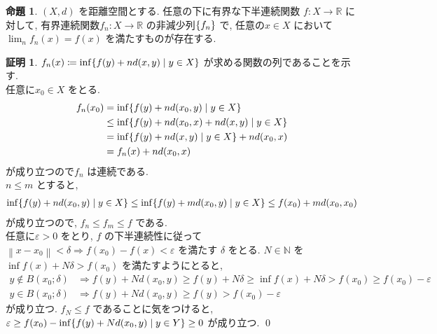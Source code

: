 \documentclass[10pt, fleqn, label-section=none, titlepage]{bxjsarticle}
\theoremstyle{definition}
\newtheorem{prop}[dfn]{命題}
\newtheorem*{pf*}{証明}
\newcommand{\veps}{\varepsilon}
\newcommand{\cbra}[1]{\mleft\{#1\mright\}}
\newcommand{\norm}[1]{\left\|#1\right\|}
\newcommand{\naraba}{\Rightarrow}
\renewcommand{\;}{\, ; \,}
\begin{document}
\begin{prop}
\label{1409}
$(X,d)$ を距離空間とする.  任意の下に有界な下半連続関数 $f:X\rightarrow \mathbb{R}$ に対して, 有界連続関数$f_n : X\rightarrow \mathbb{R}$ の非減少列$\cbra{f_n}$ で, 任意の$x  \in X$ において$\lim_n f_n (x) = f(x) $ を満たすものが存在する.
\end{prop}
\begin{pf*}
$f_n(x) \coloneqq \inf \cbra{f(y) + n d(x,y) \mid y \in X}$ が求める関数の列であることを示す. \\
任意に$x_0 \in X$ をとる.
\begin{align*}
f_n(x_0) &= \inf \cbra{f(y) + n d(x_0 , y) \mid y \in X } \\
&\leq \inf \cbra{f(y) + n d(x_0, x) + n d(x, y) \mid y \in X} \\
&= \inf \cbra{f(y) + nd(x,y) \mid y \in X} + n d(x_0, x) \\
&= f_n (x) + n d(x_0, x) 
\end{align*}
が成り立つので$f_n$ は連続である. \\
$n \leq m$ とすると, 
\begin{align*}
\inf \cbra{f(y) + n d(x_0, y) \mid y \in X} 
\leq \inf \cbra{f(y) + m d(x_0, y) \mid y \in X} \leq f(x_0) + md(x_0, x_0) 
\end{align*}
 が成り立つので, $f_n \leq f_m \leq f $ である. \\
 任意に$\veps > 0$ をとり, $f$ の下半連続性に従って$\norm{x - x_0} < \delta \naraba f(x_0) - f(x) < \veps$ を満たす $\delta$ をとる. $N \in \mathbb{N}$ を $\inf f(x) + N \delta > f(x_0) $ を満たすようにとると, 
\begin{align*}
 y \notin B(x_0; \delta) &\naraba f(y) + Nd(x_0,y) \geq f(y) + N\delta \geq \inf f(x) + N\delta > f(x_0) \geq f(x_0) - \veps \\
 y \in B(x_0 ; \delta) &\naraba f(y) + Nd(x_0,y) \geq f(y) > f(x_0) - \veps
\end{align*}
が成り立つ. $f_N \leq f$ であることに気をつけると, $\veps \geq f(x_0) - \inf \cbra{ f(y) + Nd(x_0,y) \mid y \in Y} \geq 0$ が成り立つ.
\qed
\end{pf*}
\end{document}

